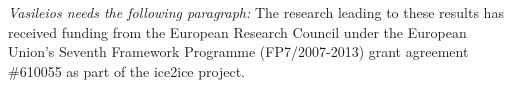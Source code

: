 \documentclass[draft, jgrga]{AGUTeX}
\begin{document}
\begin{article}







%
%
%


\begin{acknowledgments}
\textit{Vasileios needs the following paragraph:}
The research leading to these results has received funding from the European Research Council under the
European Union's Seventh Framework Programme (FP7/2007-2013) grant agreement \#610055 as part
of the ice2ice project.
\end{acknowledgments}


\end{article}
\end{document}
